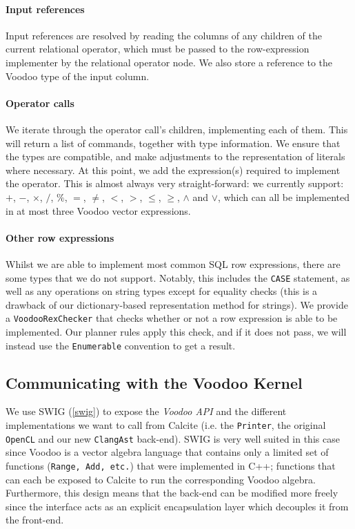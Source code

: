 \paragraph{Input references}
Input references are resolved by reading the columns of any children of the current relational operator, which must be passed to the row-expression implementer by the relational operator node. We also store a reference to the Voodoo type of the input column.

\paragraph{Operator calls}
We iterate through the operator call's children, implementing each of them. This will return a list of commands, together with type information. We ensure that the types are compatible, and make adjustments to the representation of literals where necessary. At this point, we add the expression(s) required to implement the operator. This is almost always very straight-forward: we currently support: $+$, $-$, $\times$, $/$, $\%$, $=$, $\not=$, $<$, $>$, $\leq$, $\geq$, $\land$ and $\lor$, which can all be implemented in at most three Voodoo vector expressions.

\paragraph{Other row expressions}
Whilst we are able to implement most common SQL row expressions, there are some types that we do not support. Notably, this includes the \texttt{CASE} statement, as well as any operations on string types except for equality checks (this is a drawback of our dictionary-based representation method for strings). We provide a \texttt{VoodooRexChecker} that checks whether or not a row expression is able to be implemented. Our planner rules apply this check, and if it does not pass, we will instead use the \texttt{Enumerable} convention to get a result.

\subsection{Communicating with the Voodoo Kernel}\label{swig features}

We use SWIG (\ref{swig}) to expose the \emph{Voodoo API} and the different implementations we want to call from Calcite (i.e. the \texttt{Printer}, the original \texttt{OpenCL} and our new \texttt{ClangAst} back-end). SWIG is very well suited in this case since Voodoo is a vector algebra language that contains only a limited set of functions (\texttt{Range, Add, etc.}) that were implemented in C++; functions that can each be exposed to Calcite to run the corresponding Voodoo algebra. Furthermore, this design means that the back-end can be modified more freely since the interface acts as an explicit encapsulation layer which decouples it from the front-end.

